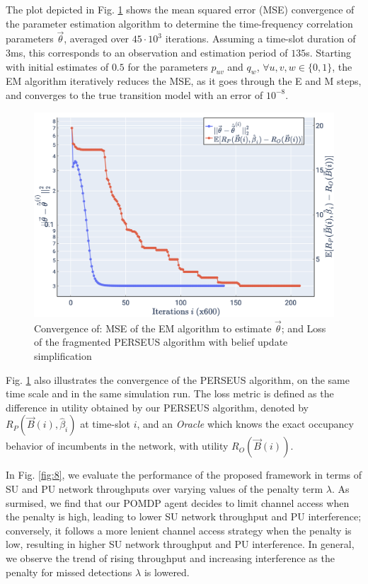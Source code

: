\documentclass[10pt,twocolumn]{IEEEtran}
\begin{document}
The plot depicted in Fig. \ref{fig:4} shows the mean squared error (MSE) convergence of the parameter estimation algorithm to determine the time-frequency correlation parameters $\vec{\theta}$, averaged over $45{\cdot} 10^3$ iterations. Assuming a time-slot duration of $3$ms, this corresponds 
to an observation and estimation period of $135$s. Starting with initial estimates of $0.5$ for the parameters $p_{uv}$ and $q_{w}$, ${\forall}u,v,w{\in}\{0,1\}$, the EM algorithm iteratively reduces the MSE, as it goes through the E and M steps, and converges to the true transition model with an error of $10^{-8}$.
\begin{figure}
    \centering
    \includegraphics[width=1.0\linewidth]{PerseusRegretConvergence_MeanSquareErrorConvergence.png}
    \caption{Convergence of: MSE of the EM algorithm to estimate $\vec{\theta}$; and Loss of the fragmented PERSEUS algorithm with belief update simplification}
    \label{fig:4}
\end{figure}
Fig. \ref{fig:4} also illustrates the convergence of the PERSEUS algorithm, on the same time scale and in the same simulation run. The loss metric is defined as the difference in utility obtained by our PERSEUS algorithm, denoted by $R_{P}(\vec{B}(i), \hat{\beta}_{i})$ at time-slot $i$, and an \emph{Oracle} which knows the exact occupancy behavior of incumbents in the network, with utility $R_{O}(\vec{B}(i))$.

In Fig. \ref{fig:8}, we evaluate the performance of the proposed framework in terms of SU and PU network throughputs over varying values of the penalty term $\lambda$. As surmised, we find that our POMDP agent decides to limit channel access when the penalty is high, leading to lower SU network throughput and PU interference; conversely, it follows a more lenient channel access strategy when the penalty is low, resulting in higher SU network throughput and PU interference. In general, we observe the trend of rising throughput and increasing interference as the penalty for missed detections $\lambda$ is lowered.
\end{document}
